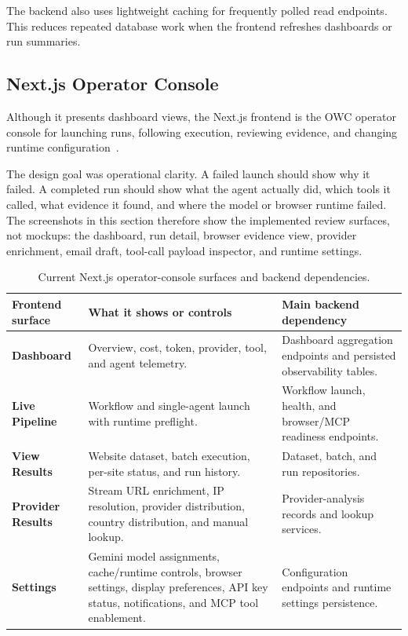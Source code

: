 The backend also uses lightweight caching for frequently polled read endpoints. This
reduces repeated database work when the frontend refreshes dashboards or
run summaries.

\subsection{Next.js Operator Console}

Although it presents dashboard views, the Next.js frontend is the OWC operator console
for launching runs, following execution, reviewing evidence, and changing runtime
configuration~\cite{nextjs}.

The design goal was operational clarity. A failed launch should show why it
failed. A completed run should show what the agent actually did, which tools it
called, what evidence it found, and where the model or browser runtime failed.
The screenshots in this section therefore show the implemented review surfaces, not
mockups: the dashboard, run detail, browser evidence view, provider enrichment, email
draft, tool-call payload inspector, and runtime settings.

\begin{table}[!htbp]\centering
\begin{tabularx}{\textwidth}{>{\raggedright\arraybackslash\bfseries}p{3.4cm}
                              >{\raggedright\arraybackslash}X
                              >{\raggedright\arraybackslash}X}
\toprule
\rowcolor{accent!8}
Frontend surface & What it shows or controls & Main backend dependency \\
\midrule
Dashboard & Overview, cost, token, provider, tool, and agent telemetry. &
Dashboard aggregation endpoints and persisted observability tables. \\
Live Pipeline & Workflow and single-agent launch with runtime preflight. &
Workflow launch, health, and browser/MCP readiness endpoints. \\
View Results & Website dataset, batch execution, per-site status, and run
history. & Dataset, batch, and run repositories. \\
Provider Results & Stream URL enrichment, IP resolution, provider distribution,
country distribution, and manual lookup. & Provider-analysis records and lookup
services. \\
Settings & Gemini model assignments, cache/runtime controls, browser settings,
display preferences, API key status, notifications, and MCP tool enablement. &
Configuration endpoints and runtime settings persistence. \\
\bottomrule
\end{tabularx}
\caption{Current Next.js operator-console surfaces and backend dependencies.}\label{tab:nextjs-surfaces}
\end{table}

